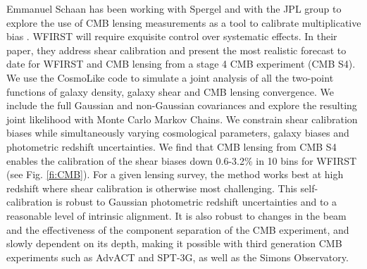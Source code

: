 Emmanuel Schaan has been working with Spergel and with the JPL group to
explore the use of CMB  lensing measurements as a tool to calibrate
multiplicative bias \citep{Schaan:2016ois}.  WFIRST  will require exquisite control over systematic
effects. In their paper, they address shear calibration and present the most
realistic forecast to date for WFIRST and CMB lensing from a stage 4 CMB experiment
(CMB S4). We use the CosmoLike code to simulate a joint analysis of all the
two-point functions of galaxy density, galaxy shear and CMB lensing convergence.
We include the full Gaussian and non-Gaussian covariances and explore the
resulting joint likelihood with Monte Carlo Markov Chains. We constrain shear
calibration biases while simultaneously varying cosmological parameters, galaxy
biases and photometric redshift uncertainties. We find that CMB lensing from CMB
S4 enables the calibration of the shear biases down 0.6-3.2\% in 10 bins for
WFIRST (see Fig. \ref{fi:CMB}). For a given lensing survey, the method works best at high redshift where
shear calibration is otherwise most challenging. This self-calibration is robust
to Gaussian photometric redshift uncertainties and to a reasonable level of
intrinsic alignment. It is also robust to changes in the beam and the
effectiveness of the component separation of the CMB experiment, and slowly
dependent on its depth, making it possible with third generation CMB experiments
such as AdvACT and SPT-3G, as well as the Simons Observatory.


